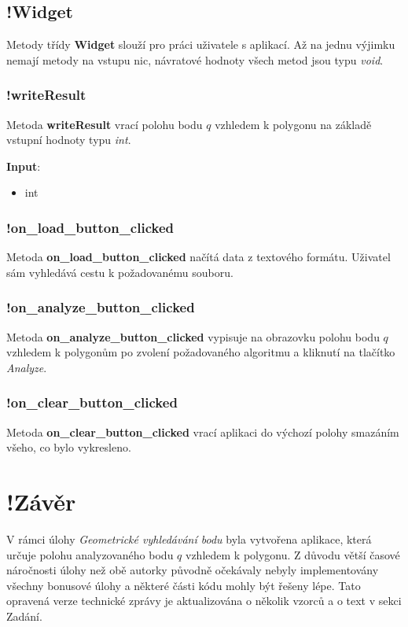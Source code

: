 \documentclass[a4paper, 12pt]{article}
\begin{document}
\subsection{!Widget}
Metody třídy \textbf{Widget} slouží pro práci uživatele s aplikací. Až na jednu výjimku nemají metody na vstupu nic, návratové hodnoty všech metod jsou typu \textsl{void}.

\subsubsection{!writeResult}
Metoda \textbf{writeResult} vrací polohu bodu $q$ vzhledem k polygonu na základě vstupní hodnoty typu \textit{int}.

\textbf{Input}:
\begin{itemize}
\item int
\end{itemize}

\subsubsection{!on\_load\_button\_clicked}
Metoda \textbf{on\_load\_button\_clicked} načítá data z textového formátu. Uživatel sám vyhledává cestu k požadovanému souboru.

\subsubsection{!on\_analyze\_button\_clicked}
Metoda \textbf{on\_analyze\_button\_clicked} vypisuje na obrazovku polohu bodu $q$ vzhledem k polygonům po zvolení požadovaného algoritmu a kliknutí na tlačítko \textsl{Analyze}.

\subsubsection{!on\_clear\_button\_clicked}
Metoda \textbf{on\_clear\_button\_clicked} vrací aplikaci do výchozí polohy smazáním všeho, co bylo vykresleno. 

\clearpage
\section{!Závěr}
V rámci úlohy \textit{Geometrické vyhledávání bodu} byla vytvořena aplikace, která určuje polohu analyzovaného bodu $q$ vzhledem k polygonu. Z důvodu větší časové náročnosti úlohy než obě autorky původně očekávaly nebyly implementovány všechny bonusové úlohy a některé části kódu mohly být řešeny lépe. Tato opravená verze technické zprávy je aktualizována o několik vzorců a o text v sekci Zadání. 
\end{document}
